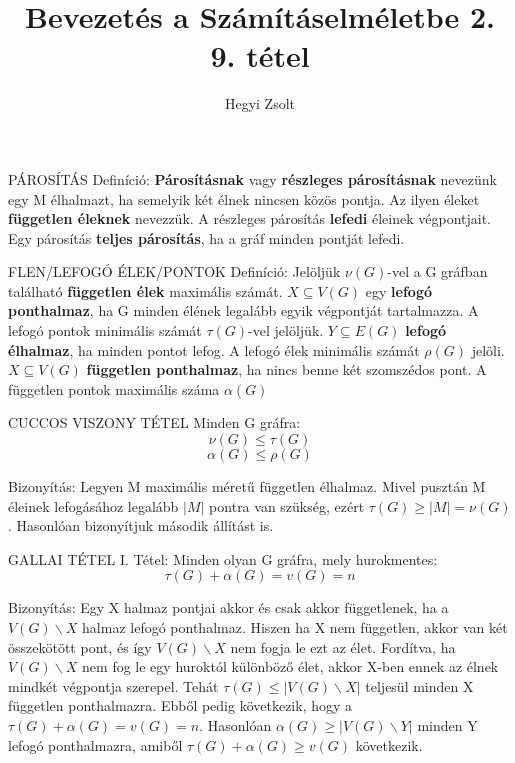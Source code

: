 \documentclass[]{article}
\title{Bevezetés a Számításelméletbe 2.\\{\large 9. tétel}}
\author{Hegyi Zsolt}
\begin{document}
\maketitle
\begin{shaded}
PÁROSÍTÁS Definíció: \textbf{Párosításnak} vagy \textbf{részleges párosításnak} nevezünk egy M élhalmazt, ha semelyik két élnek nincsen közös pontja. Az ilyen éleket \textbf{független éleknek} nevezzük. A részleges párosítás \textbf{lefedi} éleinek végpontjait. Egy párosítás \textbf{teljes párosítás}, ha a gráf minden pontját lefedi.
\end{shaded}
\begin{shaded}
FLEN/LEFOGÓ ÉLEK/PONTOK Definíció: Jelöljük $\nu(G)$-vel a G gráfban található \textbf{független élek} maximális számát. $X \subseteq V(G)$ egy \textbf{lefogó ponthalmaz}, ha G minden élének legalább egyik végpontját tartalmazza. A lefogó pontok minimális számát $\tau(G)$-vel jelöljük. $Y \subseteq E(G)$ \textbf{lefogó élhalmaz}, ha minden pontot lefog. A lefogó élek minimális számát $\rho(G)$ jelöli. $X \subseteq V(G)$ \textbf{független ponthalmaz}, ha nincs benne két szomszédos pont. A független pontok maximális száma $\alpha(G)$
\end{shaded}
\begin{framed}
CUCCOS VISZONY TÉTEL Minden G gráfra:
$$\nu(G) \leq \tau(G)$$
$$\alpha(G) \leq \rho(G)$$
\end{framed}
\begin{leftbar}
Bizonyítás: Legyen M maximális méretű független élhalmaz. Mivel pusztán M éleinek lefogásához legalább $|M|$ pontra van szükség, ezért $\tau(G) \geq |M| = \nu(G)$.
Hasonlóan bizonyítjuk második állítást is.
\end{leftbar}
\begin{framed}
GALLAI TÉTEL I. Tétel: Minden olyan G gráfra, mely hurokmentes:
$$\tau(G) + \alpha(G) = v(G) = n$$
\end{framed}
\begin{leftbar}
Bizonyítás: Egy X halmaz pontjai akkor és csak akkor függetlenek, ha a $V(G)\backslash X$ halmaz lefogó ponthalmaz. Hiszen ha X nem független, akkor van két összekötött pont, és így $V(G)\backslash X$ nem fogja le ezt az élet. Fordítva, ha $V(G)\backslash X$ nem fog le egy huroktól különböző élet, akkor X-ben ennek az élnek mindkét végpontja szerepel. Tehát $\tau(G) \leq |V(G)\backslash X|$ teljesül minden X független ponthalmazra. Ebből pedig következik, hogy a $\tau(G) + \alpha(G) = v(G) = n$. Hasonlóan $\alpha(G) \geq |V(G) \backslash Y|$ minden Y lefogó ponthalmazra, amiből $\tau(G) + \alpha(G) \geq v(G)$ következik.
\end{leftbar}
\end{document}
